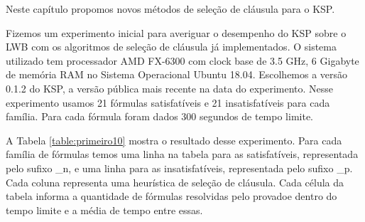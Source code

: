 Neste capítulo propomos novos métodos de seleção de cláusula para o KSP.

Fizemos um experimento inicial para averiguar o desempenho do KSP sobre o LWB com os algoritmos de seleção de cláusula já implementados. O sistema utilizado tem processador AMD FX-6300 com clock base de 3.5 GHz, 6 Gigabyte de memória RAM no Sistema Operacional Ubuntu 18.04. Escolhemos a versão 0.1.2 do KSP, a versão pública mais recente na data do experimento. Nesse experimento usamos 21 fórmulas satisfatíveis e 21 insatisfatíveis para cada família. Para cada fórmula foram dados 300 segundos de tempo limite.

A Tabela \ref{table:primeiro10} mostra o resultado desse experimento. Para cada família de fórmulas temos uma linha na tabela para as satisfatíveis, representada pelo sufixo \_n, e uma linha para as insatisfatíveis, representada pelo sufixo \_p. Cada coluna representa uma heurística de seleção de cláusula. Cada célula da tabela informa a quantidade de fórmulas resolvidas pelo provadoe dentro do tempo limite e a média de tempo entre essas.

